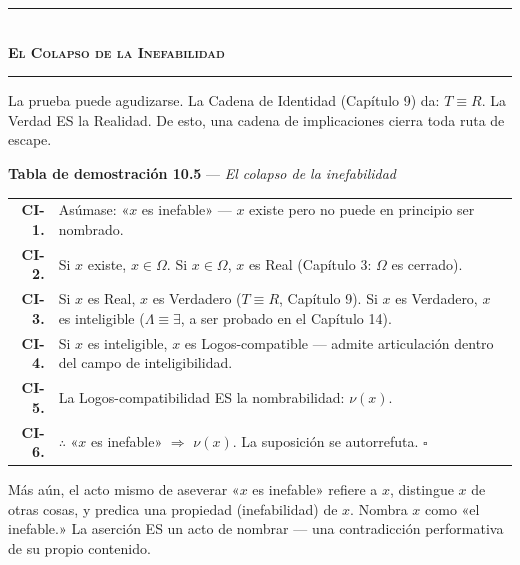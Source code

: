 \documentclass[10pt, openany, oneside]{book}
\renewcommand{\normalsize}{\fontsize{10}{13}\selectfont}
\renewcommand{\footnotesize}{\fontsize{8.5}{11}\selectfont}
\begin{document}
\vspace{1.5em}


\begin{center}
    \rule{0.3\textwidth}{0.4pt}\\[0.5em]
    {\normalsize\bfseries\scshape El Colapso de la Inefabilidad}\\[0.3em]
    \rule{0.3\textwidth}{0.4pt}
\end{center}

\vspace{1em}

\noindent La prueba puede agudizarse. La Cadena de Identidad (Capítulo 9) da: $T \equiv R$. La Verdad ES la Realidad. De esto, una cadena de implicaciones cierra toda ruta de escape.

\textbf{Tabla de demostración 10.5} --- \textit{El colapso de la inefabilidad}

\vspace{0.5em}

{\footnotesize
\noindent\begin{tabular}{r p{}}
\textbf{CI-1.} & Asúmase: «$x$ es inefable» --- $x$ existe pero no puede en principio ser nombrado. \\[0.3em]
\textbf{CI-2.} & Si $x$ existe, $x \in \Omega$. Si $x \in \Omega$, $x$ es Real (Capítulo 3: $\Omega$ es cerrado). \\[0.3em]
\textbf{CI-3.} & Si $x$ es Real, $x$ es Verdadero ($T \equiv R$, Capítulo 9). Si $x$ es Verdadero, $x$ es inteligible ($\Lambda \equiv \exists$, a ser probado en el Capítulo 14). \\[0.3em]
\textbf{CI-4.} & Si $x$ es inteligible, $x$ es Logos-compatible --- admite articulación dentro del campo de inteligibilidad. \\[0.3em]
\textbf{CI-5.} & La Logos-compatibilidad ES la nombrabilidad: $\nu(x)$. \\[0.3em]
\textbf{CI-6.} & $\therefore$ «$x$ es inefable» $\Rightarrow$ $\nu(x)$. La suposición se autorrefuta. $\square$ \\[0.3em]
\end{tabular}
}

\vspace{0.8em}

\noindent Más aún, el acto mismo de aseverar «$x$ es inefable» refiere a $x$, distingue $x$ de otras cosas, y predica una propiedad (inefabilidad) de $x$. Nombra $x$ como «el inefable.» La aserción ES un acto de nombrar --- una contradicción performativa de su propio contenido.
\end{document}
